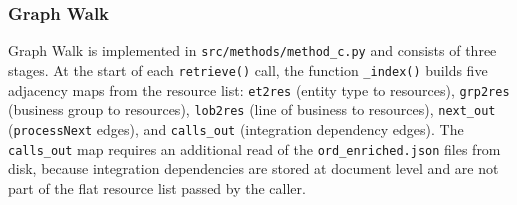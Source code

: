 \subsubsection{Graph Walk}

Graph Walk is implemented in \texttt{src/methods/method\_c.py} and consists of three stages. At the start of each \texttt{retrieve()} call, the function \texttt{\_index()} builds five adjacency maps from the resource list: \texttt{et2res} (entity type to resources), \texttt{grp2res} (business group to resources), \texttt{lob2res} (line of business to resources), \texttt{next\_out} (\texttt{processNext} edges), and \texttt{calls\_out} (integration dependency edges). The \texttt{calls\_out} map requires an additional read of the \texttt{ord\_enriched.json} files from disk, because integration dependencies are stored at document level and are not part of the flat resource list passed by the caller.

